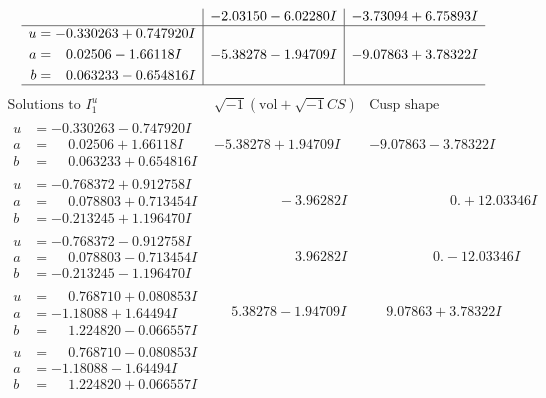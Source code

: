 \documentclass[1p]{elsarticle_modified}
\theoremstyle{definition}
\newcommand{\I}{\sqrt{-1}}
\begin{document}
$$\begin{array}{c|c|c}
 & -2.03150 - 6.02280 I & -3.73094 + 6.75893 I \\ \hline\begin{aligned}
u &= -0.330263 + 0.747920 I \\
a &= \phantom{-}0.02506 - 1.66118 I \\
b &= \phantom{-}0.063233 - 0.654816 I\end{aligned}
 & -5.38278 - 1.94709 I & -9.07863 + 3.78322 I\\
 \hline 
 \end{array}$$\newpage$$\begin{array}{c|c|c}  
\text{Solutions to }I^u_{1}& \I (\text{vol} + \sqrt{-1}CS) & \text{Cusp shape}\\
 \hline 
\begin{aligned}
u &= -0.330263 - 0.747920 I \\
a &= \phantom{-}0.02506 + 1.66118 I \\
b &= \phantom{-}0.063233 + 0.654816 I\end{aligned}
 & -5.38278 + 1.94709 I & -9.07863 - 3.78322 I \\ \hline\begin{aligned}
u &= -0.768372 + 0.912758 I \\
a &= \phantom{-}0.078803 + 0.713454 I \\
b &= -0.213245 + 1.196470 I\end{aligned}
 & \phantom{-0.000000 } -3.96282 I & \phantom{-0.000000 -}0. + 12.03346 I \\ \hline\begin{aligned}
u &= -0.768372 - 0.912758 I \\
a &= \phantom{-}0.078803 - 0.713454 I \\
b &= -0.213245 - 1.196470 I\end{aligned}
 & \phantom{-0.000000 -}3.96282 I & \phantom{-0.000000 } 0. - 12.03346 I \\ \hline\begin{aligned}
u &= \phantom{-}0.768710 + 0.080853 I \\
a &= -1.18088 + 1.64494 I \\
b &= \phantom{-}1.224820 - 0.066557 I\end{aligned}
 & \phantom{-}5.38278 - 1.94709 I & \phantom{-}9.07863 + 3.78322 I \\ \hline\begin{aligned}
u &= \phantom{-}0.768710 - 0.080853 I \\
a &= -1.18088 - 1.64494 I \\
b &= \phantom{-}1.224820 + 0.066557 I\end{aligned}

\end{array}$$
\end{document}
